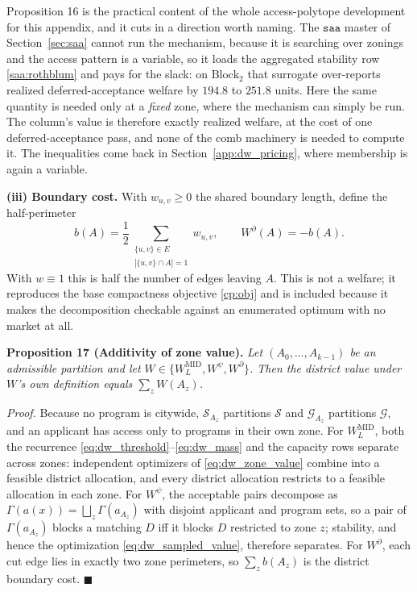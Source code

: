 \documentclass{article}
\begin{document}
Proposition 16 is the practical content of the whole access-polytope
development for this appendix, and it cuts in a direction worth naming. The
$\texttt{saa}$ master of Section~\ref{sec:saa} cannot run the mechanism,
because it is searching over zonings and the access pattern is a variable, so
it loads the aggregated stability row \eqref{saa:rothblum} and pays for the
slack: on $\text{Block}_2$ that surrogate over-reports realized
deferred-acceptance welfare by $194.8$ to $251.8$ units. Here the same quantity
is needed only at a \emph{fixed} zone, where the mechanism can simply be run.
The column's value is therefore exactly realized welfare, at the cost of one
deferred-acceptance pass, and none of the comb machinery is needed to compute
it. The inequalities come back in Section~\ref{app:dw_pricing}, where
membership is again a variable.

\noindent\textbf{(iii) Boundary cost.}
With $w_{u,v} \geq 0$ the shared boundary length, define the half-perimeter
\begin{equation}\label{eq:dw_half_perimeter}
b(A)=\frac{1}{2}\sum_{\substack{\{u,v\}\in E\\ |\{u,v\}\cap A|=1}} w_{u,v},
\qquad W^{\partial}(A) = -b(A).
\end{equation}
With $w \equiv 1$ this is half the number of edges leaving $A$. This is not a
welfare; it reproduces the base compactness objective \eqref{cp:obj} and is
included because it makes the decomposition checkable against an enumerated
optimum with no market at all.

\noindent\textbf{Proposition 17 (Additivity of zone value).} \textit{Let
$(A_0, \dots, A_{k-1})$ be an admissible partition and let
$W \in \{W^{\mathrm{MID}}_L, W^{\psi}, W^{\partial}\}$. Then the district value
under $W$'s own definition equals $\sum_{z} W(A_z)$.}

\textit{Proof.} Because no program is citywide, $\mathcal S_{A_z}$ partitions
$\mathcal S$ and $\mathcal G_{A_z}$ partitions $\mathcal G$, and an applicant
has access only to programs in their own zone. For $W^{\mathrm{MID}}_L$, both
the recurrence \eqref{eq:dw_threshold}--\eqref{eq:dw_mass} and the capacity rows
separate across zones: independent optimizers of \eqref{eq:dw_zone_value}
combine into a feasible district allocation, and every district allocation
restricts to a feasible allocation in each zone. For $W^{\psi}$, the acceptable
pairs decompose as $\Gamma(a(x)) = \bigsqcup_z \Gamma(a_{A_z})$ with disjoint
applicant and program sets, so a pair of $\Gamma(a_{A_z})$ blocks a matching
$D$ iff it blocks $D$ restricted to zone $z$; stability, and hence the
optimization \eqref{eq:dw_sampled_value}, therefore separates. For
$W^{\partial}$, each cut edge lies in exactly two zone perimeters, so
$\sum_z b(A_z)$ is the district boundary cost. $\blacksquare$
\end{document}
